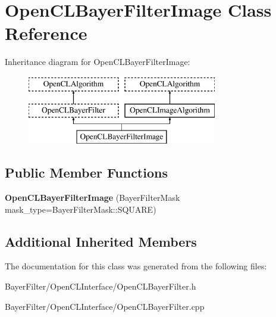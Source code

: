 \hypertarget{class_open_c_l_bayer_filter_image}{\section{Open\-C\-L\-Bayer\-Filter\-Image Class Reference}
\label{class_open_c_l_bayer_filter_image}
}
Inheritance diagram for Open\-C\-L\-Bayer\-Filter\-Image\-:\begin{figure}[H]
\begin{center}
\leavevmode
\includegraphics[height=3.000000cm]{class_open_c_l_bayer_filter_image}
\end{center}
\end{figure}
\subsection*{Public Member Functions}
\begin{DoxyCompactItemize}
\item 
\hypertarget{class_open_c_l_bayer_filter_image_acdbaec80625d8e6cc98af24e4546c04a}{{\bfseries Open\-C\-L\-Bayer\-Filter\-Image} (Bayer\-Filter\-Mask mask\-\_\-type=Bayer\-Filter\-Mask\-::\-S\-Q\-U\-A\-R\-E)}\label{class_open_c_l_bayer_filter_image_acdbaec80625d8e6cc98af24e4546c04a}

\end{DoxyCompactItemize}
\subsection*{Additional Inherited Members}


The documentation for this class was generated from the following files\-:\begin{DoxyCompactItemize}
\item 
Bayer\-Filter/\-Open\-C\-L\-Interface/Open\-C\-L\-Bayer\-Filter.\-h\item 
Bayer\-Filter/\-Open\-C\-L\-Interface/Open\-C\-L\-Bayer\-Filter.\-cpp\end{DoxyCompactItemize}
